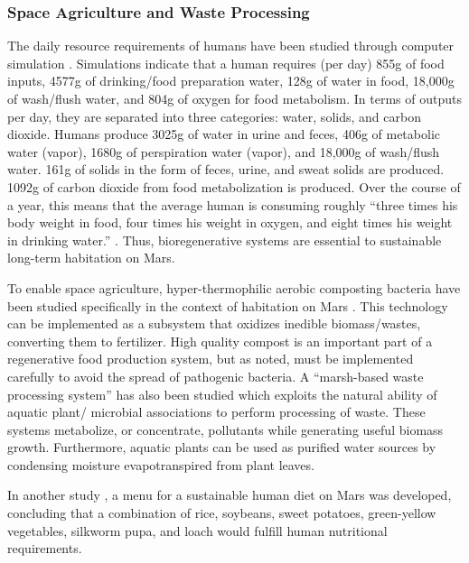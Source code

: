 \documentclass[12pt]{article}
\begin{document}
\subsubsection{Space Agriculture and Waste Processing}

The daily resource requirements of humans have been studied through computer
simulation \cite{rummel1987modular}. Simulations indicate that a human requires
(per day) 855g of food inputs, 4577g of drinking/food preparation water, 128g
of water in food, 18,000g of wash/flush water, and 804g of oxygen for food
metabolism. In terms of outputs per day, they are separated into three
categories: water, solids, and carbon dioxide. Humans produce 3025g of water
in urine and feces, 406g of metabolic water (vapor), 1680g of perspiration
water (vapor), and 18,000g of wash/flush water. 161g of solids in the form of
feces, urine, and sweat solids are produced. 1092g of carbon dioxide from
food metabolization is produced. Over the course of a year, this means that
the average human is consuming roughly ``three times his body weight in food,
four times his weight in oxygen, and eight times his weight in drinking water.''
\cite{modell1980rationale}. Thus, bioregenerative systems are essential to
sustainable long-term habitation on Mars.

To enable space agriculture, hyper-thermophilic aerobic composting bacteria
have been studied specifically in the context of habitation on Mars
\cite{kanazawa2008space}. This technology can be implemented as a subsystem
that oxidizes inedible biomass/wastes, converting them to fertilizer. High
quality compost is an important part of a regenerative food production system,
but as noted, must be implemented carefully to avoid the spread of pathogenic
bacteria. A ``marsh-based waste processing system'' \cite{nelson1992biosphere}
has also been studied which exploits the natural ability of aquatic plant/
microbial associations to perform processing of waste. These systems metabolize,
or concentrate, pollutants while generating useful biomass growth. Furthermore,
aquatic plants can be used as purified water sources by condensing moisture
evapotranspired from plant leaves.

In another study \cite{katayama2005entomophagy}, a menu for a sustainable human
diet on Mars was developed, concluding that a combination of rice, soybeans,
sweet potatoes, green-yellow vegetables, silkworm pupa, and loach would fulfill
human nutritional requirements.

\end{document}
